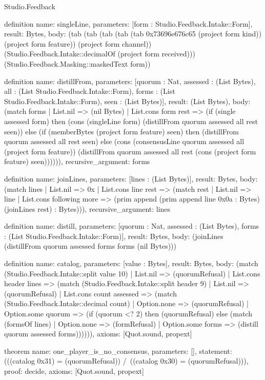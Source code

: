 \begin{lexlean}{Studio.Feedback}
\begin{semanticmodule}
definition{
  name: singleLine,
  parameters: [form : Studio.Feedback.Intake::Form],
  result: Bytes,
  body: (tab (tab (tab (tab (tab 0x73696e676c65 (project form kind)) (project form feature)) (project form channel)) (Studio.Feedback.Intake::decimalOf (project form received))) (Studio.Feedback.Masking::maskedText form))
}

definition{
  name: distillFrom,
  parameters: [quorum : Nat, assessed : (List Bytes), all : (List Studio.Feedback.Intake::Form), forms : (List Studio.Feedback.Intake::Form), seen : (List Bytes)],
  result: (List Bytes),
  body: (match forms
    | List.nil => (nil Bytes)
    | List.cons form rest => (if (single assessed form) then (cons (singleLine form) (distillFrom quorum assessed all rest seen)) else (if (memberBytes (project form feature) seen) then (distillFrom quorum assessed all rest seen) else (cons (consensusLine quorum assessed all (project form feature)) (distillFrom quorum assessed all rest (cons (project form feature) seen)))))),
  recursive_argument: forms
}

definition{
  name: joinLines,
  parameters: [lines : (List Bytes)],
  result: Bytes,
  body: (match lines
    | List.nil => 0x
    | List.cons line rest => (match rest
      | List.nil => line
      | List.cons following more => (prim append (prim append line 0x0a : Bytes) (joinLines rest) : Bytes))),
  recursive_argument: lines
}

definition{
  name: distill,
  parameters: [quorum : Nat, assessed : (List Bytes), forms : (List Studio.Feedback.Intake::Form)],
  result: Bytes,
  body: (joinLines (distillFrom quorum assessed forms forms (nil Bytes)))
}

definition{
  name: catalog,
  parameters: [value : Bytes],
  result: Bytes,
  body: (match (Studio.Feedback.Intake::split value 10)
    | List.nil => (quorumRefusal)
    | List.cons header lines => (match (Studio.Feedback.Intake::split header 9)
      | List.nil => (quorumRefusal)
      | List.cons count assessed => (match (Studio.Feedback.Intake::decimal count)
        | Option.none => (quorumRefusal)
        | Option.some quorum => (if (quorum <? 2) then (quorumRefusal) else (match (formsOf lines)
          | Option.none => (formRefusal)
          | Option.some forms => (distill quorum assessed forms)))))),
  axioms: [Quot.sound, propext]
}

theorem{
  name: one_player_is_no_consensus,
  parameters: [],
  statement: (((catalog 0x31) = (quorumRefusal)) /\ ((catalog 0x30) = (quorumRefusal))),
  proof: decide{},
  axioms: [Quot.sound, propext]
}


\end{semanticmodule}
\end{lexlean}
